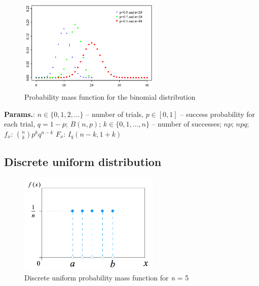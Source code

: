     \begin{figure}[H]
        \centering
        \includegraphics[width=0.6\textwidth]{images/Binomial distribution pmf.png}
        \caption{Probability mass function for the binomial distribution}
    \end{figure}




    {\color{darkblue} \textbf{Params.}:} {$n \in \{0, 1, 2, \ldots\}$ – number of trials,  $p \in [0,1]$ – success probability for each trial,  $q = 1 - p$}; {$B(n,p)$}; {$k \in \{0, 1, \ldots, n\}$ – number of successes}; {$np$}; {$npq$};\hspace{0.5cm}\\{\color{darkblue} \textbf{$f_x$}:} {$\binom{n}{k} p^k q^{n-k}$}{\color{darkblue} \textbf{$F_x$}:} {$I_{q}(n - k, 1 + k)$}



    
        
\subsection{Discrete uniform distribution}


    \begin{figure}[H]
        \centering
        \includegraphics[width=0.6\textwidth]{images/Uniform discrete pmf svg.png}
        \caption{Discrete uniform probability mass function for \textit{n} = 5}
    \end{figure}




